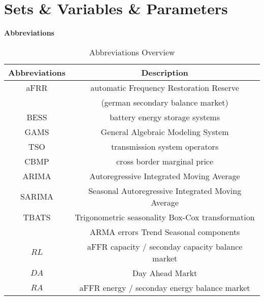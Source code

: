 \chapter*{Sets \& Variables \& Parameters}

\textbf{Abbreviations}
\begin{table}[!h]
	\centering
	\begin{tabular}{c|c}
		\textbf{Abbreviations} & \textbf{Description}                              \\
		\hline
		aFRR                   & automatic Frequency Restoration Reserve           \\
		                       & (german secondary balance market)                 \\
		BESS                   & battery energy storage systems                    \\
		GAMS                   & General Algebraic Modeling System                 \\
		TSO                    & transmission system operators                     \\
		CBMP                   & cross border marginal price                       \\
		ARIMA                  & Autoregressive Integrated Moving Average          \\
		SARIMA                 & Seasonal Autoregressive Integrated Moving Average \\
		TBATS                  & Trigonometric seasonality Box-Cox transformation  \\
		                       & ARMA errors Trend Seasonal components             \\
		$RL$                   & aFFR capacity / seconday capacity balance market  \\
		$DA$                   & Day Ahead Markt                                   \\
		$RA$                   & aFFR energy / seconday energy balance market
	\end{tabular}
	\caption{Abbreviations Overview}
	\label{tab:Abbreviations_Overview}
\end{table}\\

